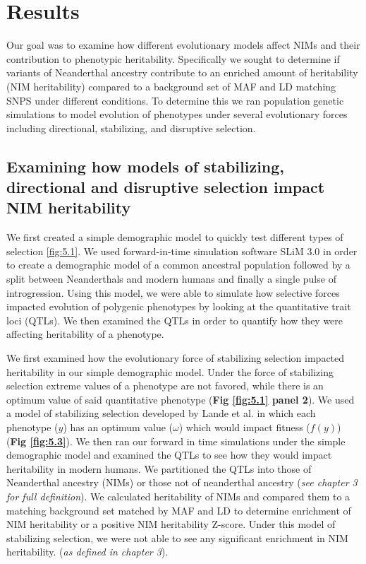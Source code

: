 \section{Results}
Our goal was to examine how different evolutionary models affect NIMs and their contribution to phenotypic heritability. Specifically we sought to determine if variants of Neanderthal ancestry contribute to an enriched amount of heritability (NIM heritability) compared to a background set of MAF and LD matching SNPS under different conditions. To determine this we ran population genetic simulations to model evolution of phenotypes under several evolutionary forces including directional, stabilizing, and disruptive selection. 
\subsection{Examining how models of stabilizing, directional and disruptive selection impact NIM heritability}
We first created a simple demographic model to quickly test different types of selection \ref{fig:5.1}. We used forward-in-time simulation software SLiM 3.0 \cite{haller2019slim} in order to create a demographic model of a common ancestral population followed by a split between Neanderthals and modern humans and finally a single pulse of introgression. Using this model, we were able to simulate how selective forces impacted evolution of polygenic phenotypes by looking at the quantitative trait loci (QTLs). We then examined the QTLs in order to quantify how they were affecting heritability of a phenotype.

We first examined how the evolutionary force of stabilizing selection impacted heritability in our simple demographic model. Under the force of stabilizing selection extreme values of a phenotype are not favored, while there is an optimum value of said quantitative phenotype (\textbf{Fig \ref{fig:5.1} panel 2}). We used a model of stabilizing selection developed by Lande et al. \cite{lande1976natural} in which each phenotype ($y$) has an optimum value ($\omega$) which would impact fitness ($f(y)$) (\textbf{Fig \ref{fig:5.3}}). We then ran our forward in time simulations under the simple demographic model and examined the QTLs to see how they would impact heritability in modern humans. We partitioned the QTLs into those of Neanderthal ancestry (NIMs) or those not of neanderthal ancestry (\textit{see chapter 3 for full definition}). We calculated heritability of NIMs and compared them to a matching background set matched by MAF and LD to determine enrichment of NIM heritability  or a positive NIM heritability Z-score. Under this model of stabilizing selection, we were not able to see any significant enrichment in NIM heritability. (\textit{as defined in chapter 3}).

